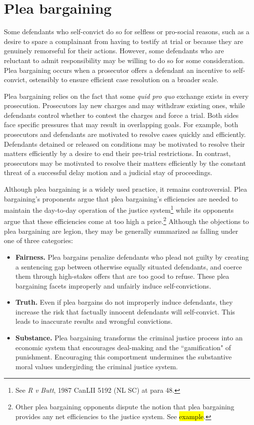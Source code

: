 \section{Plea bargaining}

Some defendants who self-convict do so for selfless or pro-social reasons, such as a desire to spare a complainant from having to testify at trial or because they are genuinely remorseful for their actions. However, some defendants who are reluctant to admit responsibility may be willing to do so for some consideration. Plea bargaining occurs when a prosecutor offers a defendant an incentive to self-convict, ostensibly to ensure efficient case resolution on a broader scale. 

Plea bargaining relies on the fact that some \textit{quid pro quo} exchange exists in every prosecution. Prosecutors lay new charges and may withdraw existing ones, while defendants control whether to contest the charges and force a trial. Both sides face specific pressures that may result in overlapping goals. For example, both prosecutors and defendants are motivated to resolve cases quickly and efficiently. Defendants detained or released on conditions may be motivated to resolve their matters efficiently by a desire to end their pre-trial restrictions. In contrast, prosecutors may be motivated to resolve their matters efficiently by the constant threat of a successful delay motion and a judicial stay of proceedings.

Although plea bargaining is a widely used practice, it remains controversial. Plea bargaining's proponents argue that plea bargaining's efficiencies are needed to maintain the day-to-day operation of the justice system\footnote{See \textit{R v Butt}, 1987 CanLII 5192 (NL SC) at para 48.} while its opponents argue that these efficiencies come at too high a price.\footnote{Other plea bargaining opponents dispute the notion that plea bargaining provides any net efficiencies to the justice system. See \hl{example}.} Although the objections to plea bargaining are legion, they may be generally summarized as falling under one of three categories:

\begin{itemize}
    \item \textbf{Fairness.} Plea bargains penalize defendants who plead not guilty by creating a sentencing gap between otherwise equally situated defendants, and coerce them through high-stakes offers that are too good to refuse. These plea bargaining facets improperly and unfairly induce self-convictions.
    \item \textbf{Truth.} Even if plea bargains do not improperly induce defendants, they increase the risk that factually innocent defendants will self-convict. This leads to inaccurate results and wrongful convictions.
    \item \textbf{Substance.} Plea bargaining transforms the criminal justice process into an economic system that encourages deal-making and the ``gamification" of punishment. Encouraging this comportment undermines the substantive moral values undergirding the criminal justice system.
\end{itemize}

